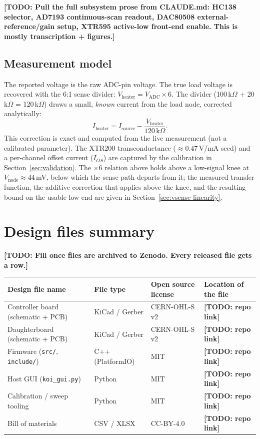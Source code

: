 \documentclass[11pt]{article}
\newif\ifdraft\drafttrue
\newcommand{\todo}[1]{\ifdraft{\color{red}\textbf{[TODO: #1]}}\fi}
\begin{document}
\todo{Pull the full subsystem prose from CLAUDE.md: HC138 selector, AD7193
continuous-scan readout, DAC80508 external-reference/gain setup, XTR595
active-low front-end enable. This is mostly transcription + figures.}

\subsection{Measurement model}
The reported voltage is the raw ADC-pin voltage. The true load voltage is
recovered with the 6:1 sense divider: $V_\text{heater} = V_\text{ADC}\times 6$.
The divider (100\,k$\Omega$ + 20\,k$\Omega$ = 120\,k$\Omega$) draws a small,
\emph{known} current from the load node, corrected analytically:
\[
  I_\text{heater} = I_\text{source} - \frac{V_\text{heater}}{120\,\text{k}\Omega}.
\]
This correction is exact and computed from the live measurement (not a
calibrated parameter). The XTR200 transconductance ($\approx 0.47$\,V/mA seed)
and a per-channel offset current ($I_{OS}$) are captured by the calibration in
Section~\ref{sec:validation}. The $\times6$ relation above holds above a
low-signal knee at $V_\text{node}\approx44$\,mV, below which the sense path
departs from it; the measured transfer function, the additive correction that
applies above the knee, and the resulting bound on the usable low end are
given in Section~\ref{sec:vsense-linearity}.

\section{Design files summary}
\label{sec:design-files}
\todo{Fill once files are archived to Zenodo. Every released file gets a row.}

\renewcommand{\arraystretch}{1.25}
\noindent\begin{tabularx}{\textwidth}{@{}L{3.4cm} L{2.6cm} L{3.0cm} X@{}}
\toprule
\textbf{Design file name} & \textbf{File type} & \textbf{Open source license} & \textbf{Location of the file} \\
\midrule
Controller board (schematic + PCB) & KiCad / Gerber & CERN-OHL-S v2 & \todo{repo link} \\
Daughterboard (schematic + PCB) & KiCad / Gerber & CERN-OHL-S v2 & \todo{repo link} \\
Firmware (\texttt{src/}, \texttt{include/}) & C++ (PlatformIO) & MIT & \todo{repo link} \\
Host GUI (\texttt{koi\_gui.py}) & Python & MIT & \todo{repo link} \\
Calibration / sweep tooling & Python & MIT & \todo{repo link} \\
Bill of materials & CSV / XLSX & CC-BY-4.0 & \todo{repo link} \\
\bottomrule
\end{tabularx}
\renewcommand{\arraystretch}{1.0}
\end{document}
